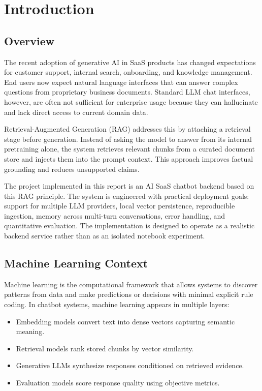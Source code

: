 \documentclass[12pt,letterpaper]{report}
\begin{document}
\clearpage
{}

\chapter{Introduction}

\section{Overview}
The recent adoption of generative AI in SaaS products has changed expectations for customer support, internal search, onboarding, and knowledge management. End users now expect natural language interfaces that can answer complex questions from proprietary business documents. Standard LLM chat interfaces, however, are often not sufficient for enterprise usage because they can hallucinate and lack direct access to current domain data. 

Retrieval-Augmented Generation (RAG) addresses this by attaching a retrieval stage before generation. Instead of asking the model to answer from its internal pretraining alone, the system retrieves relevant chunks from a curated document store and injects them into the prompt context. This approach improves factual grounding and reduces unsupported claims. 

The project implemented in this report is an AI SaaS chatbot backend based on this RAG principle. The system is engineered with practical deployment goals: support for multiple LLM providers, local vector persistence, reproducible ingestion, memory across multi-turn conversations, error handling, and quantitative evaluation. The implementation is designed to operate as a realistic backend service rather than as an isolated notebook experiment.

\section{Machine Learning Context}
Machine learning is the computational framework that allows systems to discover patterns from data and make predictions or decisions with minimal explicit rule coding. In chatbot systems, machine learning appears in multiple layers:
\begin{itemize}
\item Embedding models convert text into dense vectors capturing semantic meaning.
\item Retrieval models rank stored chunks by vector similarity.
\item Generative LLMs synthesize responses conditioned on retrieved evidence.
\item Evaluation models score response quality using objective metrics.
\end{itemize}
\end{document}
